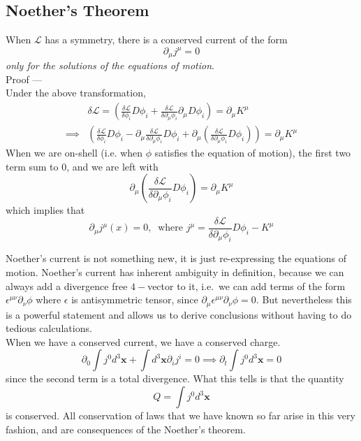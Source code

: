 \documentclass[11pt]{article}
\newcommand{\del}{\partial}
\newcommand{\ld}{\mathcal{L}}
\numberwithin{equation}{section}
\begin{document}
    \subsection{Noether's Theorem}
    When \(\ld\) has a symmetry, there is a conserved current of the form
    \begin{equation*}
        \del_\mu j^\mu = 0
    \end{equation*} 
    \textit{only for the solutions of the equations of motion}.\\

    Proof —\\
    Under the above transformation,
    \begin{align*}
        &\delta \ld = \left( \frac{\delta \ld}{\delta \phi_i} D\phi_i  + \frac{\delta \ld}{\delta \del_\mu \phi_i} \del_\mu D\phi_i \right) = \del_\mu K^\mu \\
        \implies & \left( \frac{\delta \ld}{\delta \phi_i} D\phi_i  -\del_\mu \frac{\delta \ld}{\delta \del_\mu \phi_i} D\phi_i + \del_\mu \left( \frac{\delta \ld}{\delta \del_\mu \phi_i} D\phi_i \right)  \right) = \del_\mu K^\mu 
    \end{align*}
    When we are on-shell (i.e. when \(\phi\) satisfies the equation of motion), the first two term sum to 0, and we are left with 
    \begin{equation*}
        \del_\mu \left( \frac{\delta \ld}{\delta \del_\mu \phi_i} D\phi_i \right) = \del_\mu K^\mu
    \end{equation*}
    which implies that  
    \begin{equation*}
        \del_\mu j^\mu(x) =0, ~\text{ where  } j^\mu = \frac{\delta \ld}{\delta \del_\mu \phi_i} D\phi_i  - K^\mu 
    \end{equation*}

    Noether's current is not something new, it is just re-expressing the equations of motion. Noether's current has inherent ambiguity in definition, because we can always add a divergence free \(4-\)vector to it, i.e.\ we can add terms of the form \(\epsilon^{\mu\nu} \del_\nu \phi\) where \(\epsilon\) is antisymmetric tensor, since \(\del_\mu \epsilon^{\mu\nu} \del_\nu \phi = 0\). But nevertheless this is a powerful statement and allows us to derive conclusions without having to do tedious calculations.\\

    When we have a conserved current, we have a conserved charge.
    \begin{equation*}
        \del_0 \int j^0 d^3\textbf{x} + \int d^3\textbf{x} \del_i j^i = 0 \implies \del_t \int j^0 d^3\textbf{x} = 0
    \end{equation*}
    since the second term is a total divergence. What this tells is that the quantity 
    \begin{equation*}
        Q = \int j^0 d^3\textbf{x}
    \end{equation*} 
    is conserved. All conservation of laws that we have known so far arise in this very fashion, and are consequences of the Noether's theorem.\\
\end{document}
